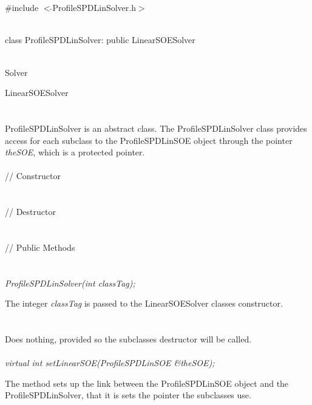 
 \\

   \\
\#include $<\tilde{ }$ProfileSPDLinSolver.h$>$  


  \\
class ProfileSPDLinSolver: public LinearSOESolver  


 \\
 Solver 

\indent\indent LinearSOESolver \\
\indent\indent{} \\

  \\
\indent ProfileSPDLinSolver is an abstract class.  The ProfileSPDLinSolver
class provides access for each subclass to the ProfileSPDLinSOE object
through the pointer {\em theSOE}, which is a protected pointer. \\

  \\
\indent\indent // Constructor \\
\indent{}  \\ \\
\indent\indent // Destructor \\
\indent{}\\  \\
\indent\indent // Public Methods \\
\indent{} \\

  \\
{\em ProfileSPDLinSolver(int classTag);}  

The integer {\em classTag} is passed to the LinearSOESolver classes
constructor. \\ 

 \\
\\ 
Does nothing, provided so the subclasses destructor will be called. \\

  \\
{\em virtual int setLinearSOE(ProfileSPDLinSOE \&theSOE);} 

The method sets up the link between the ProfileSPDLinSOE object and the
ProfileSPDLinSolver, that it is sets the pointer the subclasses use.  \\